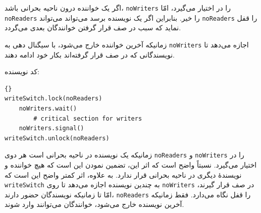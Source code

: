 \documentclass{book}
\begin{document}
    اگر یک خواننده درون ناحیه بحرانی باشد، {\tt noWriters} را در اختیار می‌گیرد، امّا {\tt noReaders} را خیر. 
    بنابراین اگر یک نویسنده برسد می‌تواند می‌تواند {\tt noReaders} را قفل نماید که سبب در صف قرار گرفتن خوانندگان بعدی می‌گردد. 

    زمانیکه آخرین خواننده خارج می‌شود، با سیگنال دهی به {\tt noWriters} اجازه می‌دهد تا نویسندگانی که در صف قرار گرفته‌اند بکار خود ادامه دهند. 

    کد نویسنده: 

\begin{latin}
\begin{latin}
\begin{lstlisting}[title=\rl{راه حل نویسنده با اولویت نویسنده}]{}
writeSwitch.lock(noReaders)
    noWriters.wait()
        # critical section for writers
    noWriters.signal()
writeSwitch.unlock(noReaders)
\end{lstlisting}
\end{latin}
\end{latin}

    زمانیکه یک نویسنده در ناحیه بحرانی است هر دوی {\tt noReaders} و {\tt noWriters} را در اختیار می‌گیرد. 
    نسبتاً واضح است که اثر این، تضمین نمودن این است که هیچ خواننده و نویسندهٔ دیگری در ناحیه بحرانی قرار ندارد. 
    به علاوه، اثر کمتر واضح این است که {\tt writeSwitch} به چندین نویسنده اجازه می‌دهد تا روی {\tt noWriters} در صف قرار گیرند،‌ 
    امّا تا زمانیکه نویسندگان حضور دارند،   {\tt noReaders} را قفل نگاه می‌دارد. 
    فقط زمانیکه آخرین نویسنده خارج می‌شود، خوانندگان می‌توانند وارد شوند. 
\end{document}
